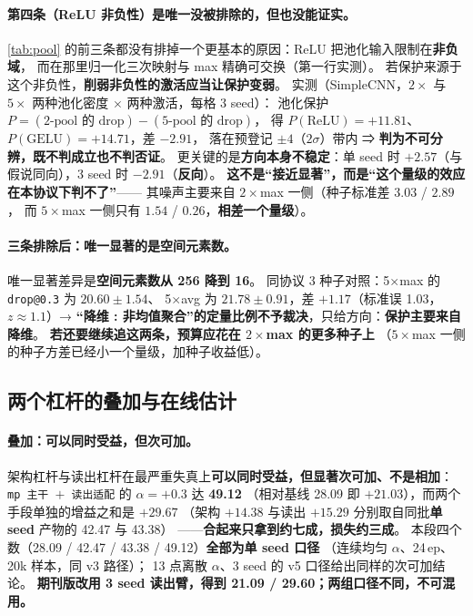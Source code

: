 \documentclass[11pt,a4paper]{ctexart}
\begin{document}
\paragraph{第四条（ReLU 非负性）是唯一没被排除的，但也没能证实。}
\cref{tab:pool} 的前三条都没有排掉一个更基本的原因：ReLU 把池化输入限制在\textbf{非负域}，
而在那里归一化三次映射与 max 精确可交换（第一行实测）。
若保护来源于这个非负性，\textbf{削弱非负性的激活应当让保护变弱}。
实测（SimpleCNN，$2\times$ 与 $5\times$ 两种池化密度 $\times$ 两种激活，每格 3 seed）：
池化保护 $P=(\text{2-pool 的 drop})-(\text{5-pool 的 drop})$，
得 $P(\text{ReLU})=+11.81$、$P(\text{GELU})=+14.71$，差 $-2.91$，
落在预登记 $\pm4$（$2\sigma$）带内 ⇒ \textbf{判为不可分辨，既不判成立也不判否证}。
更关键的是\textbf{方向本身不稳定}：单 seed 时 $+2.57$（与假说同向），3 seed 时 $-2.91$（\textbf{反向}）。
\textbf{这不是“接近显著”，而是“这个量级的效应在本协议下判不了”}——
其噪声主要来自 $2\times$max 一侧（种子标准差 $3.03$ / $2.89$，
而 $5\times$max 一侧只有 $1.54$ / $0.26$，\textbf{相差一个量级}）。

\paragraph{三条排除后：唯一显著的是空间元素数。}
唯一显著差异是\textbf{空间元素数从 256 降到 16}。
同协议 3 种子对照：5$\times$max 的 \texttt{drop@0.3} 为 $20.60\pm1.54$、
5$\times$avg 为 $21.78\pm0.91$，差 $+1.17$（标准误 1.03，$z\approx1.1$）→
\textbf{“降维 : 非均值聚合”的定量比例不予裁决}，只给方向：\textbf{保护主要来自降维}。
\textbf{若还要继续追这两条，预算应花在 $2\times$max 的更多种子上}
（$5\times$max 一侧的种子方差已经小一个量级，加种子收益低）。

\label{sec:chain}   %
\subsection{两个杠杆的叠加与在线估计}

\paragraph{叠加：可以同时受益，但次可加。}
架构杠杆与读出杠杆在最严重失真上\textbf{可以同时受益，但显著次可加、不是相加}：
\texttt{mp 主干 $+$ 读出适配} 的 $\alpha=+0.3$ 达 \textbf{49.12}
（相对基线 28.09 即 $+21.03$），而两个手段单独的增益之和是 $+29.67$
（架构 $+14.38$ 与读出 $+15.29$ 分别取自同批\textbf{单 seed} 产物的 42.47 与 43.38）
——\textbf{合起来只拿到约七成，损失约三成}。
本段四个数（28.09 / 42.47 / 43.38 / 49.12）\textbf{全部为单 seed 口径}
（连续均匀 $\alpha$、24\,ep、20k 样本，同 v3 路径）；
13 点离散 $\alpha$、3 seed 的 v5 口径给出同样的次可加结论。
\textbf{期刊版改用 3 seed 读出臂，得到 21.09 / 29.60；两组口径不同，不可混用。}
\end{document}
